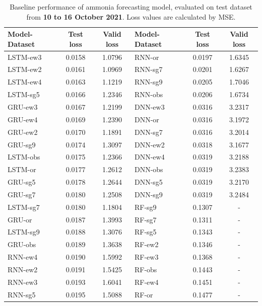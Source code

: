 \begin{table}[!ht]
    \centering
    \caption{Baseline performance of ammonia forecasting model, evaluated on test dataset from \textbf{10 to 16 October 2021}. Loss values are calculated by MSE.}\label{tab:baseline-result-oct-nh3}
    \begin{NiceTabular}{lcclcc}
        \toprule
        Model-Dataset & Test loss & Valid loss & Model-Dataset & Test loss & Valid loss \\
        \midrule
        LSTM-ew3 & 0.0158 & 1.0796 & RNN-or  & 0.0197 & 1.6345 \\
        LSTM-ew2 & 0.0161 & 1.0969 & RNN-sg7 & 0.0201 & 1.6267 \\
        LSTM-ew4 & 0.0163 & 1.1219 & RNN-sg9 & 0.0205 & 1.7046 \\
        LSTM-sg5 & 0.0166 & 1.2346 & RNN-obs & 0.0206 & 1.6734 \\
        GRU-ew3  & 0.0167 & 1.2199 & DNN-ew3 & 0.0316 & 3.2317 \\
        GRU-ew4  & 0.0169 & 1.2390 & DNN-or  & 0.0316 & 3.1972 \\
        GRU-ew2  & 0.0170 & 1.1891 & DNN-sg7 & 0.0316 & 3.2014 \\
        GRU-sg9  & 0.0174 & 1.3097 & DNN-ew2 & 0.0318 & 3.1677 \\
        LSTM-obs & 0.0175 & 1.2366 & DNN-ew4 & 0.0319 & 3.2188 \\
        LSTM-or  & 0.0177 & 1.2612 & DNN-obs & 0.0319 & 3.2383 \\
        GRU-sg5  & 0.0178 & 1.2644 & DNN-sg5 & 0.0319 & 3.2170 \\
        GRU-sg7  & 0.0180 & 1.2508 & DNN-sg9 & 0.0319 & 3.2484 \\
        LSTM-sg7 & 0.0180 & 1.1804 & RF-sg9  & 0.1307 & - \\
        GRU-or   & 0.0187 & 1.3993 & RF-sg7  & 0.1311 & - \\
        LSTM-sg9 & 0.0188 & 1.3076 & RF-sg5  & 0.1343 & - \\
        GRU-obs  & 0.0189 & 1.3638 & RF-ew2  & 0.1346 & - \\
        RNN-ew4  & 0.0190 & 1.5992 & RF-ew3  & 0.1368 & - \\
        RNN-ew2  & 0.0191 & 1.5425 & RF-obs  & 0.1443 & - \\
        RNN-ew3  & 0.0193 & 1.6041 & RF-ew4  & 0.1451 & - \\
        RNN-sg5  & 0.0195 & 1.5088 & RF-or   & 0.1477 & - \\
        \bottomrule
    \end{NiceTabular}
\end{table}

